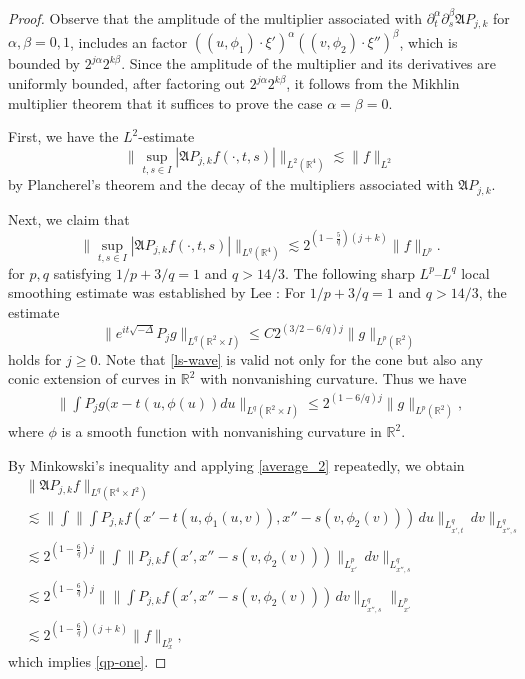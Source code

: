 \documentclass[10pt] %
{amsart}
\theoremstyle{plain}
\numberwithin{equation}{section}
\newcommand{\R}{\mathbb R}
\begin{document}
\begin{proof}
Observe that the amplitude of the multiplier associated with $\partial_t^\alpha \partial_s^\beta \mathfrak A P_{j,k}$ for $\alpha,\beta =0,1$, includes an factor $((u,\phi_1)\cdot \xi')^\alpha((v,\phi_2)\cdot \xi'')^\beta$, which is bounded by $2^{j\alpha}2^{k\beta}$. Since the amplitude of the multiplier and its derivatives are uniformly bounded, after factoring out $2^{j\alpha}2^{k\beta}$, it follows from the Mikhlin multiplier theorem that it suffices to prove the case $\alpha=\beta=0$.

First, we have the $L^2$-estimate
\begin{equation}\label{22-one}
\big\| \sup_{t,s\in I } | \mathfrak A P_{j,k} f(\cdot,t,s)| \big\|_{L^2 (\mathbb R^4)} \lesssim   \|f\|_{L^2}
\end{equation}
by Plancherel's theorem and the decay of the multipliers associated with $\mathfrak A P_{j,k}$.

Next, we claim that 
\begin{equation}\label{qp-one}
\big\|\sup_{t,s\in I } | \mathfrak A P_{j,k} f(\cdot,t,s)| \big\|_{L^q (\mathbb R^4)}
\lesssim 2^{(1-\frac 5q)(j+k)}  \|f\|_{L^p}.
\end{equation}
for $p,q$ satisfying $1/p + 3/q =1$ and $q >14/3$.  
The following sharp $L^p$--$L^q$ local smoothing estimate was established by Lee \cite[Proposition 1.2]{Lee}:
For $1/p + 3/q =1$ and $q >14/3$, the estimate
\begin{equation}\label{ls-wave}
\big\| e^{i t \sqrt{-\Delta} } P_j g \big\|_{L^q(\mathbb R^2\times I)} \le C 2^{(3/2 - 6/  q)j} \|g\|_{L^p(\mathbb R^2)}
\end{equation}
holds for $j\ge 0 $. 
Note that \eqref{ls-wave} is valid not only for the cone but also any conic extension of curves in $\mathbb R^2$ with nonvanishing curvature. 
Thus we have
\begin{align}\label{average_2}
\Big\| \int P_jg(x - t(u, \phi(u))du 
\Big\|_{L^q (\mathbb R^2\times I)} \le 2^{(1-6/q)j} \| g\|_{L^p(\R^2)},
\end{align}
where $\phi$ is a smooth function with nonvanishing curvature in $\R^2$.

By Minkowski's inequality and applying \eqref{average_2} repeatedly, we obtain
\begin{align*}
&\big\| \mathfrak A P_{j,k} f \big\|_{L^q (\mathbb R^4\times I^2)} \\
&\lesssim
\Big\|\int\Big\|\int P_{j,k}f(x'-t(u,\phi_1(u,v) ), x''-s(v,\phi_2(v)) )\,du\Big\|
_{L_{x',t}^q} \,dv\Big\|_{L_{x'',s}^q} \\
& \lesssim 2^{(1-\frac6q) j }
\Big \|\int \big\|  P_{j,k}f(x', x''-s(v,\phi_2(v) ) ) \big\|
_{L_{x'}^p} \,dv\Big\|_{L_{x'',s}^q} \\ 
&\lesssim 2^{(1-\frac6q) j } \Big\| \Big\|  \int     P_{j,k}f(x', x''-s(v,\phi_2(v) ) )   \, dv \Big\|_{L_{x'',s}^q}  \Big\|_{L_{x'}^p} \\ 
& \lesssim 2^{(1-\frac6q) (j+k) } \| f  \|_{L_{x}^p}  ,
\end{align*}
which implies \eqref{qp-one}. 


\end{proof}
\end{document}
